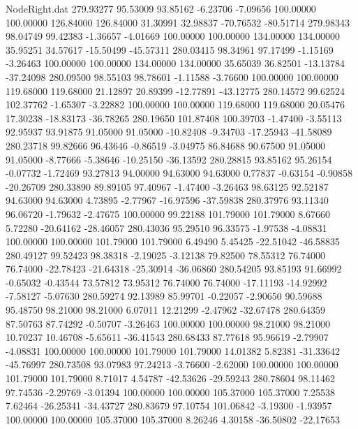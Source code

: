 \begin{filecontents}{NodeRight.dat}
 279.93277   95.53009   93.85162    -6.23706   -7.09656  100.00000  100.00000  126.84000  126.84000   31.30991   32.98837  -70.76532  -80.51714
 279.98343   98.04749   99.42383    -1.36657   -4.01669  100.00000  100.00000  134.00000  134.00000   35.95251   34.57617  -15.50499  -45.57311
 280.03415   98.34961   97.17499    -1.15169   -3.26463  100.00000  100.00000  134.00000  134.00000   35.65039   36.82501  -13.13784  -37.24098
 280.09500   98.55103   98.78601    -1.11588   -3.76600  100.00000  100.00000  119.68000  119.68000   21.12897   20.89399  -12.77891  -43.12775
 280.14572   99.62524  102.37762    -1.65307   -3.22882  100.00000  100.00000  119.68000  119.68000   20.05476   17.30238  -18.83173  -36.78265
 280.19650  101.87408  100.39703    -1.47400   -3.55113   92.95937   93.91875   91.05000   91.05000  -10.82408   -9.34703  -17.25943  -41.58089
 280.23718   99.82666   96.43646    -0.86519   -3.04975   86.84688   90.67500   91.05000   91.05000   -8.77666   -5.38646  -10.25150  -36.13592
 280.28815   93.85162   95.26154    -0.07732   -1.72469   93.27813   94.00000   94.63000   94.63000    0.77837   -0.63154   -0.90858  -20.26709
 280.33890   89.89105   97.40967    -1.47400   -3.26463   98.63125   92.52187   94.63000   94.63000    4.73895   -2.77967  -16.97596  -37.59838
 280.37976   93.11340   96.06720    -1.79632   -2.47675  100.00000   99.22188  101.79000  101.79000    8.67660    5.72280  -20.64162  -28.46057
 280.43036   95.29510   96.33575    -1.97538   -4.08831  100.00000  100.00000  101.79000  101.79000    6.49490    5.45425  -22.51042  -46.58835
 280.49127   99.52423   98.38318    -2.19025   -3.12138   79.82500   78.55312   76.74000   76.74000  -22.78423  -21.64318  -25.30914  -36.06860
 280.54205   93.85193   91.66992    -0.65032   -0.43544   73.57812   73.95312   76.74000   76.74000  -17.11193  -14.92992   -7.58127   -5.07630
 280.59274   92.13989   85.99701    -0.22057   -2.90650   90.59688   95.48750   98.21000   98.21000    6.07011   12.21299   -2.47962  -32.67478
 280.64359   87.50763   87.74292    -0.50707   -3.26463  100.00000  100.00000   98.21000   98.21000   10.70237   10.46708   -5.65611  -36.41543
 280.68433   87.77618   95.96619    -2.79907   -4.08831  100.00000  100.00000  101.79000  101.79000   14.01382    5.82381  -31.33642  -45.76997
 280.73508   93.07983   97.24213    -3.76600   -2.62000  100.00000  100.00000  101.79000  101.79000    8.71017    4.54787  -42.53626  -29.59243
 280.78604   98.11462   97.74536    -2.29769   -3.01394  100.00000  100.00000  105.37000  105.37000    7.25538    7.62464  -26.25341  -34.43727
 280.83679   97.10754  101.06842    -3.19300   -1.93957  100.00000  100.00000  105.37000  105.37000    8.26246    4.30158  -36.50802  -22.17653

\end{filecontents}
